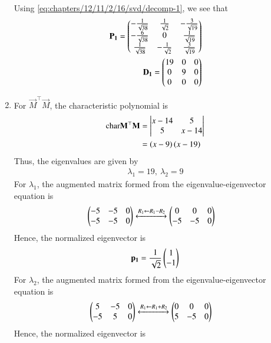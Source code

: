\begin{enumerate}
\begin{align}
        \end{align}
        Using \eqref{eq:chapters/12/11/2/16/svd/decomp-1}, we see that
        \begin{align}
            \mathbf{P_1} = \begin{pmatrix}-\frac{1}{\sqrt{38}}&\frac{1}{\sqrt{2}}&-\frac{3}{\sqrt{19}}\\-\frac{6}{\sqrt{38}}&0&\frac{1}{\sqrt{19}}\\\frac{1}{\sqrt{38}}&-\frac{1}{\sqrt{2}}&\frac{3}{\sqrt{19}}\end{pmatrix} \\
            \mathbf{D_1} = \begin{pmatrix}19&0&0\\0&9&0\\0&0&0\end{pmatrix}
            \label{eq:chapters/12/11/2/16/svd/eig-params-1}
        \end{align}
        \item For $\vec{M}^\top\vec{M}$, the characteristic polynomial is
        \begin{align}
		\text{char}{\mathbf{M}^\top\mathbf{M}} &= \begin{vmatrix}x-14&5\\5&x-14\end{vmatrix} \\
                                      &= \left(x-9\right)\left(x-19\right)
        \end{align}
        Thus, the eigenvalues are given by
        \begin{align}
            \lambda_1 = 19,\ \lambda_2 = 9
        \end{align}
        For $\lambda_1$, the augmented matrix formed from the 
        eigenvalue-eigenvector equation is
        \begin{align}
            \begin{pmatrix}-5&-5&0\\-5&-5&0\end{pmatrix} &\xleftrightarrow[]{R_1 \leftarrow R_1-R_2} \begin{pmatrix}0&0&0\\-5&-5&0\end{pmatrix}
        \end{align}
        Hence, the normalized eigenvector is
        \begin{align}
            \mathbf{p_1} = \frac{1}{\sqrt{2}}\begin{pmatrix}1\\-1\end{pmatrix}
        \end{align}
        For $\lambda_2$, the augmented matrix formed from the 
        eigenvalue-eigenvector equation is
        \begin{align}
            \begin{pmatrix}5&-5&0\\-5&5&0\end{pmatrix} &\xleftrightarrow[]{R_1 \leftarrow R_1+R_2} \begin{pmatrix}0&0&0\\5&-5&0\end{pmatrix}
        \end{align}
        Hence, the normalized eigenvector is

\end{enumerate}
